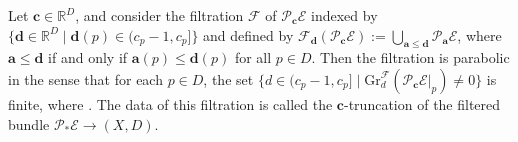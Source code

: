 \documentclass[11pt]{article}
\numberwithin{equation}{section}
\numberwithin{equation}{section}
\begin{document}
Let $\boldsymbol{c}\in \mathbb{R}^{D}$, and consider the filtration $\mathcal{F}$ of $\mathcal{P}_{\boldsymbol{c}}\mathcal{E}$ indexed by $\bigl\{\boldsymbol{d}\in \mathbb{R}^{D} \mid \boldsymbol{d}(p)\in (c_p-1,c_p] \bigr\}$ and defined by $\mathcal{F}_{\boldsymbol{d}}(\mathcal{P}_{\boldsymbol{c}}\mathcal{E}):=\bigcup_{\boldsymbol{a}\leq \boldsymbol{d}}\mathcal{P}_{\boldsymbol{a}}\mathcal{E}$, where $\boldsymbol{a}\leq \boldsymbol{d}$ if and only if $\boldsymbol{a}(p)\leq \boldsymbol{d}(p)$ for all $p\in D$. Then the filtration is parabolic in the sense that for each $p \in D$, the set $\bigl\{d\in (c_p-1,c_p] \mid \text{Gr}^{\mathcal{F}}_d(\mathcal{P}_{\boldsymbol{c}}\mathcal{E}|_p)\neq 0\bigr\}$ is finite, where . The data of this filtration is called the $\boldsymbol{c}$-truncation of the filtered bundle $\mathcal{P}_{*}\mathcal{E}\to (X,D)$.
\end{document}
